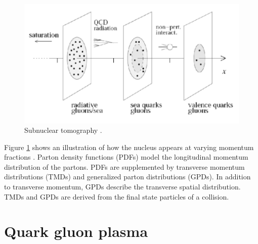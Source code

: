 \begin{figure}[h!]
\begin{centering}
\includegraphics[width=7in]{Chapter1/importfigs/imaging_the_nucleon_upc_dijets_pres.png}
\par\end{centering}
\caption{Subnuclear tomography \cite{Accardi:2011mz}. \label{fig:nuclImag}}
\end{figure}

Figure \ref{fig:nuclImag} shows an illustration of how the nucleus appears at varying momentum fractions \cite{Accardi:2011mz}. Parton density functions (PDFs) model the longitudinal momentum distribution of the partons. PDFs are supplemented by transverse momentum distributions (TMDs) and generalized parton distributions (GPDs). In addition to transverse momentum, GPDs describe the transverse spatial distribution. TMDs and GPDs are derived from the final state particles of a collision.

\section{Quark gluon plasma}

